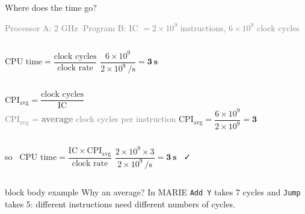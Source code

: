 \documentclass[aspectratio=169,10pt]{beamer}
\newcommand{\ok}{\textcolor{aExec}{\faCheck}}
\newcommand{\keymsg}[1]{%
  \begin{beamercolorbox}[rounded=true,sep=0.1cm,wd=\textwidth]{block body example}
    \centering\footnotesize #1
  \end{beamercolorbox}}
\begin{document}
\begin{frame}{Where does the time go?}
  \begin{center}
    \footnotesize\textcolor{gray}{Processor A: 2 GHz \quad$\cdot$\quad Program B: IC $= 2 \times 10^9$ instructions, $6 \times 10^9$ clock cycles}
  \end{center}
  \vspace{0.1cm}
  \begin{columns}[c,onlytextwidth]
      \centering\large
      $\text{CPU time} = \dfrac{\text{clock cycles}}{\text{clock rate}}$
      \small $\dfrac{6 \times 10^9}{2 \times 10^9\ \text{/s}} = \mathbf{3\ s}$
  \end{columns}
  \pause
  \vspace{0.4cm}
  \begin{columns}[c,onlytextwidth]
      \centering\large
      $\text{CPI}_{\text{avg}} = \dfrac{\text{clock cycles}}{\text{IC}}$\\[0.05cm]
      \scriptsize\textcolor{gray}{CPI$_{\text{avg}}$ = \textbf{average} clock cycles per instruction}
      \small $\text{CPI}_{\text{avg}} = \dfrac{6 \times 10^9}{2 \times 10^9} = \mathbf{3}$
  \end{columns}
  \pause
  \vspace{0.4cm}
  \begin{columns}[c,onlytextwidth]
      \centering\large
      so \ $\text{CPU time} = \dfrac{\text{IC} \times \text{CPI}_{\text{avg}}}{\text{clock rate}}$
      \small $\dfrac{2 \times 10^9 \times 3}{2 \times 10^9\ \text{/s}} = \mathbf{3\ s}$ \ \ok
  \end{columns}
  \vfill
  \keymsg{Why an average? In MARIE \texttt{Add Y} takes 7 cycles and \texttt{Jump} takes 5:
    different instructions need different numbers of cycles.}
\end{frame}
\end{document}
